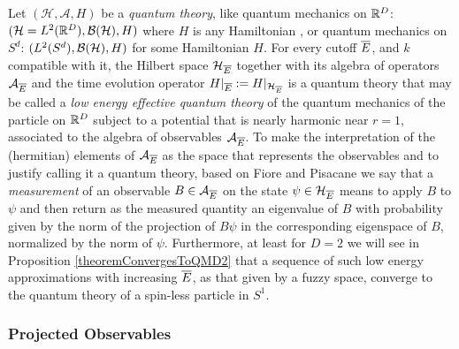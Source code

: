 Let $(\mathcal H, \mathcal A, H)$ be a \emph{quantum theory}, like quantum mechanics on $\mathbb{R}^D$: $(\mathcal H = L^2(\mathbb{R}^D), \mathcal B(\mathcal H), H)$ where $H$ is any %
Hamiltonian%
, or quantum mechanics on $S^d$: $(L^2(S^d), \mathcal B(\mathcal H), H)$ for some Hamiltonian $H$. For every cutoff $\overline{E}$, and $k$ compatible with it, the Hilbert space $\mathcal H_{\overline{E}}$ together with its algebra of operators $\mathcal A_{\overline{E}}$ and the time evolution operator $H|_{\overline{E}} := H|_{\mathcal H_{\overline{E}}}$ is a quantum theory that may be called a \emph{low energy effective quantum theory} of the quantum mechanics of the particle on $\mathbb{R}^D$ subject to a potential that is nearly harmonic near $r = 1$, associated to the algebra of observables $\mathcal A_{\overline{E}}$. To make the interpretation of the (hermitian) elements of $\mathcal A_{\overline{E}}$ as the space that represents the observables and to justify calling it a quantum theory, based on Fiore and Pisacane \cite{Fiore2018} we  say that a \emph{measurement} of an observable $B \in \mathcal A_{\overline{E}}$ on the state $\psi \in \mathcal H_{\overline{E}}$ means to apply $B$ to $\psi$ and then return as the measured quantity an eigenvalue of $B$ with probability given by the norm of the projection of $B \psi$ in the corresponding eigenspace of $B$, normalized by the norm of $\psi$. 
Furthermore, at least for $D = 2$ we will see in Proposition \ref{theoremConvergesToQMD2} that a sequence of such low energy approximations with increasing $\overline{E}$, as that given by a fuzzy space, converge to the quantum theory of a spin-less particle in $S^1$.


\subsubsection{Projected Observables}

